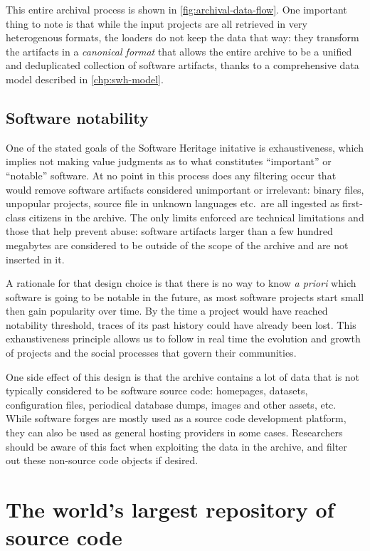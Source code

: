 This entire archival process is shown in \cref{fig:archival-data-flow}. One
important thing to note is that while the input projects are all retrieved in
very heterogenous formats, the loaders do not keep the data that way: they
transform the artifacts in a \emph{canonical format} that allows the entire
archive to be a unified and deduplicated collection of software artifacts,
thanks to a comprehensive data model described in \cref{chp:swh-model}.

\subsection{Software notability}

One of the stated goals of the Software Heritage initative is exhaustiveness,
which implies not making value judgments as to what constitutes ``important''
or ``notable'' software. At no point in this process does any filtering occur
that would remove software artifacts considered unimportant or irrelevant:
binary files, unpopular projects, source file in unknown languages etc.\ are
all ingested as first-class citizens in the archive. The only limits enforced
are technical limitations and those that help prevent abuse: software artifacts
larger than a few hundred megabytes are considered to be outside of the scope
of the archive and are not inserted in it.

A rationale for that design choice is that there is no way to know \emph{a
priori} which software is going to be notable in the future, as most software
projects start small then gain popularity over time. By the time a project
would have reached notability threshold, traces of its past history could have
already been lost. This exhaustiveness principle allows us to follow in real
time the evolution and growth of projects and the social processes that govern
their communities.

One side effect of this design is that the archive contains a lot of data that
is not typically considered to be software source code: homepages, datasets,
configuration files, periodical database dumps, images and other assets, etc.
While software forges are mostly used as a source code development platform,
they can also be used as general hosting providers in some cases. Researchers
should be aware of this fact when exploiting the data in the archive, and
filter out these non-source code objects if desired.

\section{The world's largest repository of source code}

